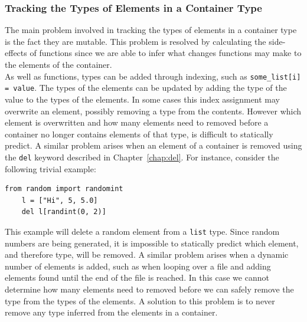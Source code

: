 \documentclass[12pt, titlepage]{article}
\begin{document}
\subsubsection*{Tracking the Types of Elements in a Container Type}
The main problem involved in tracking the types of elements in a container type is the fact they are mutable. This problem is resolved by calculating the side-effects of functions since we are able to infer what changes functions may make to the elements of the container. \\
\indent As well as functions, types can be added through indexing, such as \texttt{some\_list[i] = value}. The types of the elements can be updated by adding the type of the value to the types of the elements. In some cases this index assignment may overwrite an element, possibly removing a type from the contents. However which element is overwritten  and how many elements need to removed before a container no longer contains elements of that type, is difficult to statically predict. A similar problem arises when an element of a container is removed using the \texttt{del} keyword described in Chapter~\ref{chap:del}. For instance, consider the following trivial example:
\begin{lstlisting}[mathescape]
    from random import randomint
    l = ["Hi", 5, 5.0]
    del l[randint(0, 2)]
\end{lstlisting}
This example will delete a random element from a \texttt{list} type. Since random numbers are being generated, it is impossible to statically predict which element, and therefore type, will be removed. A similar problem arises when a dynamic number of elements is added, such as when looping over a file and adding elements found until the end of the file is reached. In this case we cannot determine how many elements need to removed before we can safely remove the type from the types of the elements. A solution to this problem is to never remove any type inferred from the elements in a container.

\end{document}

